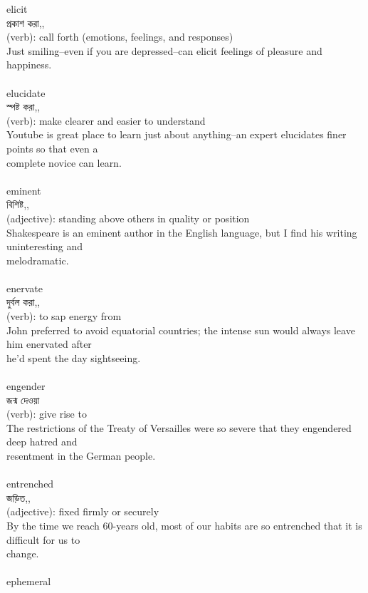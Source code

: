 \documentclass{article}
\begin{document}
{elicit}\\
{প্রকাশ করা,,}\\
{(verb): call forth (emotions, feelings, and responses)\\Just smiling--even if you are depressed--can elicit feelings of pleasure and happiness.\\}\\
{elucidate}\\
{স্পষ্ট করা,,}\\
{(verb): make clearer and easier to understand\\Youtube is great place to learn just about anything--an expert elucidates finer points so that even a\\complete novice can learn.\\}\\
{eminent}\\
{বিশিষ্ট,,}\\
{(adjective): standing above others in quality or position\\Shakespeare is an eminent author in the English language, but I find his writing uninteresting and\\melodramatic.\\}\\
{enervate}\\
{দুর্বল করা,,}\\
{(verb): to sap energy from\\John preferred to avoid equatorial countries; the intense sun would always leave him enervated after\\he'd spent the day sightseeing.\\}\\
{engender}\\
{জন্ম দেওয়া}\\
{(verb): give rise to\\The restrictions of the Treaty of Versailles were so severe that they engendered deep hatred and\\resentment in the German people.\\}\\
{entrenched}\\
{জড়িত,,}\\
{(adjective): fixed firmly or securely\\By the time we reach 60-years old, most of our habits are so entrenched that it is difficult for us to\\change.\\}\\
{ephemeral}\\
\end{document}
